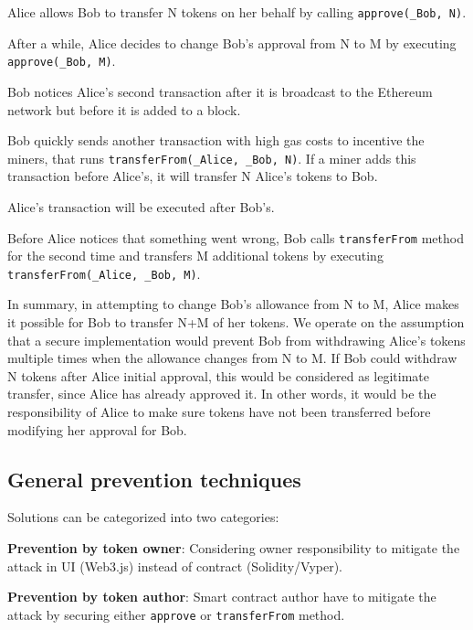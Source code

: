 \begin{compactlistn}
	\item Alice allows Bob to transfer N tokens on her behalf by calling \texttt{approve(\_Bob, N)}.
	\item After a while, Alice decides to change Bob's approval from N to M by executing \texttt{approve(\_Bob, M)}.
	\item Bob notices Alice's second transaction after it is broadcast to the Ethereum network but before it is added to a block. 
	\item Bob quickly sends another transaction with high gas costs to incentive the miners, that runs \texttt{transferFrom(\_Alice, \_Bob, N)}. If a miner adds this transaction before Alice's, it will transfer N Alice's tokens to Bob.
	\item Alice's transaction will be executed after Bob's.
	\item Before Alice notices that something went wrong, Bob calls \texttt{transferFrom} method for the second time and transfers M additional tokens by executing \texttt{transferFrom(\_Alice, \_Bob, M)}.
\end{compactlistn}

In summary, in attempting to change Bob's allowance from N to M, Alice makes it possible for Bob to transfer N+M of her tokens. We operate on the assumption that a secure implementation would prevent Bob from withdrawing Alice's tokens multiple times when the allowance changes from N to M. If Bob could withdraw N tokens after Alice initial approval, this would be considered as legitimate transfer, since Alice has already approved it. In other words, it would be the responsibility of Alice to make sure tokens have not been transferred before modifying her approval for Bob.

\subsection{General prevention techniques}

Solutions can be categorized into two categories:
\begin{compactlist}
	\item \textbf{Prevention by token owner}: Considering owner responsibility to mitigate the attack in UI (\eg Web3.js) instead of contract (\ie Solidity/Vyper).
	\item \textbf{Prevention by token author}: Smart contract author have to mitigate the attack by securing either \texttt{approve} or \texttt{transferFrom} method.
\end{compactlist}

